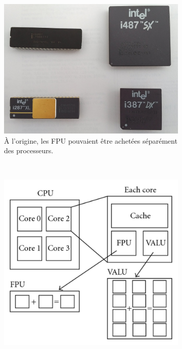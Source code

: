         \begin{figure}
            \centering
            \begin{subfigure}[b]{0.45\linewidth}
                \includegraphics[width=\linewidth]{images/cpu_fpu.jpg}
                \caption{À l'origine, les FPU pouvaient être achetées séparément des processeurs.}
                \label{pic_cpu_fpu}
            \end{subfigure}
            ~ %
            \begin{subfigure}[b]{0.45\linewidth}
                \includegraphics[width=\linewidth]{images/cpu_fpu_recent.png}

\end{subfigure}
\end{figure}
